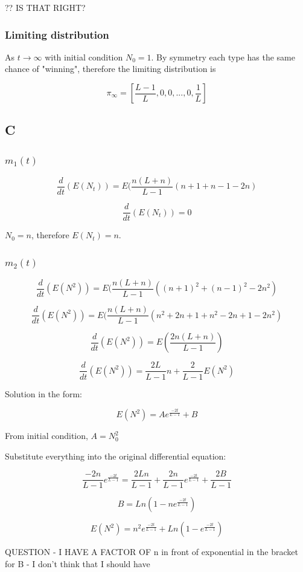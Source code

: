 \documentclass{article}
\begin{document}
?? IS THAT RIGHT? 
 
\subsubsection{Limiting distribution}

As $t \to \infty$ with initial condition $N_0 = 1$. By symmetry each type has the same chance of "winning", therefore the limiting distribution is

$$ \pi_{\infty} = [\frac{L-1}{L},0,0,...,0,\frac{1}{L}]$$

\subsection{C}

\subsubsection{$m_1(t)$}

$$\frac{d}{dt}(E(N_t)) = E(\frac{n(L+n)}{L-1}(n + 1 + n - 1 -2n)$$

$$\frac{d}{dt}(E(N_t)) = 0$$

$N_0 = n$, therefore $E(N_t)=n$.

\subsubsection{$m_2(t)$}

$$\frac{d}{dt}(E(N^2)) = E(\frac{n(L+n)}{L-1}((n + 1)^2 + (n - 1)^2 -2n^2)$$

$$\frac{d}{dt}(E(N^2)) = E(\frac{n(L+n)}{L-1}(n^2 + 2n + 1 + n^2 - 2n + 1 -2n^2)$$

$$\frac{d}{dt}(E(N^2)) = E(\frac{2n(L+n)}{L-1})$$

$$\frac{d}{dt}(E(N^2)) = \frac{2L}{L-1}n + \frac{2}{L-1}E(N^2)$$

Solution in the form:

$$E(N^2) = Ae^{\frac{-2t}{L-1}} + B$$

From initial condition, $A=N_0^2$

Substitute everything into the original differential equation:

$$\frac{-2n}{L-1}e^{\frac{-2t}{L-1}} = \frac{2Ln}{L-1} + \frac{2n}{L-1}e^{\frac{-2t}{L-1}} + \frac{2B}{L-1}$$

$$B = Ln(1-ne^{\frac{-2t}{L-1}})$$

$$E(N^2) = n^2e^{\frac{-2t}{L-1}} + Ln(1-e^{\frac{-2t}{L-1}})$$

QUESTION - I HAVE A FACTOR OF n in front of exponential in the bracket for B - I don't think that I should have
\end{document}
